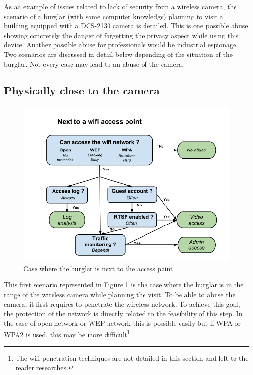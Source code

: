As an example of issues related to lack of security from a wireless camera, the scenario of a burglar (with some computer knowledge) planning to visit a building equipped with a DCS-2130 camera is detailed.
This is one possible abuse showing concretely the danger of forgetting the privacy aspect while using this device.
Another possible abuse for professionals would be industrial espionage.
Two scenarios are discussed in detail below depending of the situation of the burglar.
Not every case may lead to an abuse of the camera.

\subsection{Physically close to the camera}

\begin{figure}[h]
  \centering
  \includegraphics[width=13cm]{images/burglar-inside.png}
  \caption{Case where the burglar is next to the access point}
  \label{fig:burglar-inside}
\end{figure}

This first scenario represented in Figure \ref{fig:burglar-inside} is the case where the burglar is in the range of the wireless camera while planning the visit.
To be able to abuse the camera, it first requires to penetrate the wireless network.
To achieve this goal, the protection of the network is directly related to the feasibility of this step.
In the case of open network or WEP network this is possible easily but if WPA or WPA2 is used, this may be more difficult\footnote{The wifi penetration techniques are not detailed in this section and left to the reader researches.}\\

